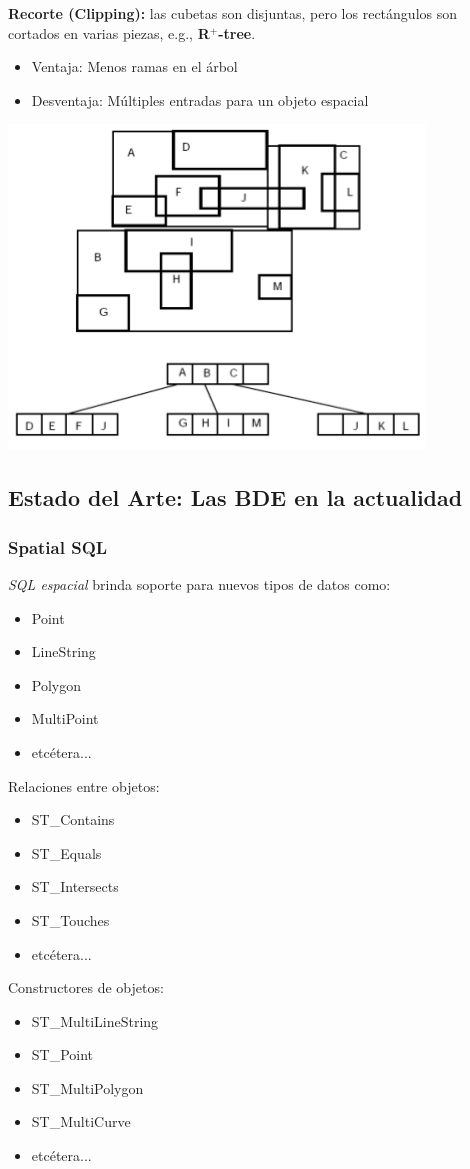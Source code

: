 \documentclass[a4paper,12pt,oneside]{report}
\begin{document}
\noindent \textbf{Recorte (Clipping):} las cubetas son disjuntas, pero los rect\'angulos son cortados en varias piezas, e.g., \textbf{R$^+$-tree}.
\begin{itemize}
\item Ventaja: Menos ramas en el \'arbol
\item Desventaja: M\'ultiples entradas para un objeto espacial
\end{itemize}
\begin{center}\includegraphics[scale=0.5]{Imagenes/14.png}
\end{center}

\subsection*{Estado del Arte: Las BDE en la actualidad}

\subsubsection*{Spatial SQL}

\textit{SQL espacial} brinda soporte para nuevos tipos de datos como:
\begin{itemize}
\item Point
\item LineString
\item Polygon
\item MultiPoint
\item etc\'etera...
\end{itemize}
Relaciones entre objetos:
\begin{itemize}
\item ST\_Contains
\item ST\_Equals
\item ST\_Intersects
\item ST\_Touches
\item etc\'etera...
\end{itemize}
Constructores de objetos:
\begin{itemize}
\item ST\_MultiLineString
\item ST\_Point
\item ST\_MultiPolygon
\item ST\_MultiCurve
\item etc\'etera...
\end{itemize}
\end{document}
